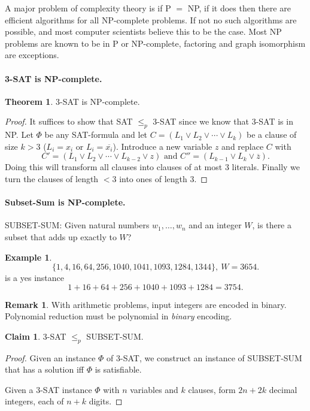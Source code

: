 \documentclass[11pt,a4paper]{article}
\theoremstyle{definition}
\newtheorem{thm}{Theorem}
\newtheorem{claim}{Claim}
\newtheorem{ex}{Example}
\newtheorem{rem}{Remark}
\begin{document}
A major problem of complexity theory is if P $=$ NP, if it does then there are efficient algorithms for all NP-complete problems.
If not no such algorithms are possible, and most computer scientists believe this to be the case.
Most NP problems are known to be in P or NP-complete, factoring and graph isomorphism are exceptions.

\paragraph{3-SAT is NP-complete.}
\begin{thm}
3-SAT is NP-complete.
\end{thm}
\begin{proof}
It suffices to show that SAT $\le_p$ 3-SAT since we know that 3-SAT is in NP.%
Let $\Phi$ be any SAT-formula and let $C = (L_1\vee L_2 \vee \cdots \vee L_k)$ be a clause of size $k > 3$ ($L_i = x_i$ or $L_i = \overline{x_i}$).
Introduce a new variable $z$ and replace $C$ with
\[
C' = (L_1 \vee L_2 \vee \cdots \vee L_{k-2} \vee z)\text{ and }C'' = (L_{k-1} \vee L_k \vee \overline{z}).
\]
Doing this will transform all clauses into clauses of at most 3 literals.
Finally we turn the clauses of length $< 3$ into ones of length 3.
\end{proof}

\paragraph{Subset-Sum is NP-complete.}
SUBSET-SUM: Given natural numbers $w_1,\ldots,w_n$ and an integer $W$, is there a subset that adds up exactly to $W$?

\begin{ex}
\[
\{1,4,16,64,256,1040,1041,1093,1284,1344\},\ W = 3654.
\]
is a yes instance
\[
1 + 16 + 64 + 256 + 1040 + 1093 + 1284 = 3754.
\]
\end{ex}

\begin{rem}
With arithmetic problems, input integers are encoded in binary.
Polynomial reduction must be polynomial in \emph{binary} encoding.
\end{rem}

\begin{claim}
3-SAT $\le_p$ SUBSET-SUM.
\end{claim}
\begin{proof}
Given an instance $\Phi$ of 3-SAT, we construct an instance of SUBSET-SUM that has a solution iff $\Phi$ is satisfiable.

Given a 3-SAT instance $\Phi$ with $n$ variables and $k$ clauses, form $2n + 2k$ decimal integers, each of $n+k$ digits. %
\end{proof}
\end{document}
